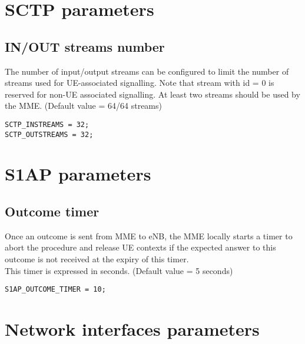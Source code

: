 \documentclass[a4paper,oneside]{report}
\begin{document}
\section{SCTP parameters}
\subsection{IN/OUT streams number}
The number of input/output streams can be configured to limit the number of streams
used for UE-associated signalling. Note that stream with id = 0 is reserved for
non-UE associated signalling. At least two streams should be used by the MME.
(Default value = 64/64 streams)
\begin{lstlisting}
SCTP_INSTREAMS = 32;
SCTP_OUTSTREAMS = 32;
\end{lstlisting}

\section{S1AP parameters}
\subsection{Outcome timer}
Once an outcome is sent from MME to eNB, the MME locally starts a timer to abort
the procedure and release UE contexts if the expected answer to this outcome is not
received at the expiry of this timer.\\
This timer is expressed in seconds. (Default value = 5 seconds)
\begin{lstlisting}
S1AP_OUTCOME_TIMER = 10;
\end{lstlisting}

\section{Network interfaces parameters}
\end{document}

